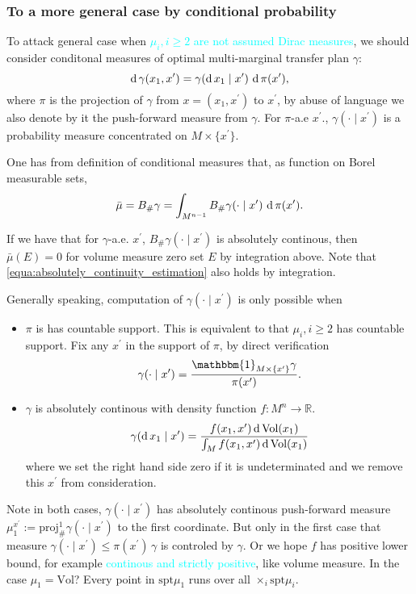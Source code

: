 \subsubsection{To a more general case by conditional probability}
To attack general case when \textcolor{cyan}{$\mu_i, i \geq 2$ are not assumed Dirac measures},
we should consider conditonal measures of optimal multi-marginal transfer plan $\gamma$:
\[
	\operatorname{d} \gamma(x_1, x^\prime)= \gamma(\operatorname{d} x_1 \mid x^\prime)\, \operatorname{d} \pi(x^\prime) ,
\]
where $\pi$ is the projection of $\gamma$ from $x = (x_1, x^\prime)$ to $x^\prime$,
by abuse of language we also denote by it the push-forward measure from $\gamma$.
For $\pi$-a.e $x^\prime$., $\gamma(\cdot \mid x^\prime)$ is a probability measure
concentrated on $M \times \{x^\prime\}$.

One has from definition of conditional measures that,
as function on Borel measurable sets,
\[
	\bar{\mu} = B_{\#} \gamma = \int_{M^{n-1}} B_{\#} \gamma(\cdot \mid x^\prime)\, \operatorname{d} \pi(x^\prime).
\]


If we have that for $\gamma$-a.e. $x^\prime$,
$B_{\#} \gamma(\cdot \mid x^\prime)$
is absolutely continous,
then $\bar{\mu}(E)=0$ for volume measure zero set $E$ by integration above.
Note that \cref{equa:absolutely_continuity_estimation} also holds by integration.

Generally speaking, computation of $\gamma(\cdot \mid x^\prime)$ is only possible when
\begin{itemize}
	\item $\pi$ is has countable support.
	      This is equivalent to that $\mu_i, i \geq 2$ has countable support.
	      Fix any $x^\prime$ in the support of $\pi$, by direct verification
	      \[
		      \gamma(\cdot \mid x^\prime) =
		      \frac{
			      \mathbbm{1}_{M \times \{x^\prime\}}
			      \gamma
		      }{\pi(x^\prime)}.
	      \]
	\item $\gamma$ is absolutely continous with density function $f: M^n \rightarrow \mathbb{R} $.
	      \[
		      \gamma(\operatorname{d} x_1 \mid x^\prime) =
		      \frac{
			      f(x_1, x^\prime) \operatorname{d} \text{Vol}(x_1)
		      }
		      {\int_{M} f(x_1, x^\prime) \operatorname{d} \text{Vol}(x_1)
		      }
	      \]
	      where we set the right hand side zero if it is undeterminated
	      and we remove this $x^\prime$ from consideration.
\end{itemize}
Note in both cases,
$\gamma(\cdot \mid x^\prime)$
has absolutely continous push-forward measure
$\mu_1^{x^\prime} := \text{proj}^1_{\#}\gamma(\cdot \mid x^\prime)$
to the first coordinate.
But only in the first case that
measure $\gamma(\cdot \mid x^\prime) \leq \pi(x^\prime) \, \gamma$ is controled by $\gamma$.
Or we hope $f$ has positive lower bound,
for example \textcolor{cyan}{continous and strictly positive}, like volume measure.
In the case $\mu_1=\text{Vol}$? Every point in $\text{spt}\mu_1$ runs over all $\times_i \text{spt}\mu_i$.

